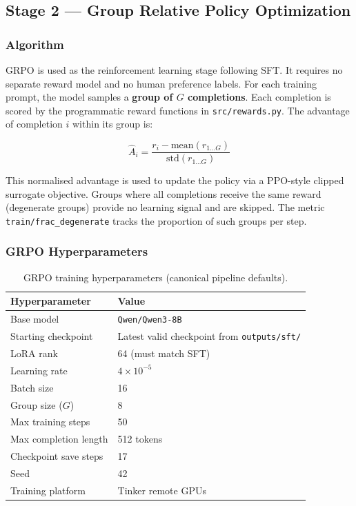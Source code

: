 \documentclass[12pt, a4paper]{article}
\newcommand{\thead}[1]{\textbf{#1}}
\begin{document}
\vspace{8pt}

\subsection{Stage 2 --- Group Relative Policy Optimization}

\subsubsection{Algorithm}

GRPO is used as the reinforcement learning stage following SFT. It requires no
separate reward model and no human preference labels. For each training prompt,
the model samples a \textbf{group of $G$ completions}. Each completion is scored
by the programmatic reward functions in \texttt{src/rewards.py}. The
advantage of completion $i$ within its group is:

\begin{equationbox}
\[
  \hat{A}_i = \frac{r_i - \mathrm{mean}(r_{1\ldots G})}{\mathrm{std}(r_{1\ldots G})}
\]
\end{equationbox}

This normalised advantage is used to update the policy via a PPO-style clipped
surrogate objective. Groups where all completions receive the same reward
(degenerate groups) provide no learning signal and are skipped. The metric
\texttt{train/frac\_degenerate} tracks the proportion of such groups per step.

\subsubsection{GRPO Hyperparameters}

\begin{table}[H]
\centering
\caption{GRPO training hyperparameters (canonical pipeline defaults).}
\begin{tabularx}{\linewidth}{L{5cm} C{9.2cm}}
\toprule
\thead{Hyperparameter} & \thead{Value} \\
\midrule
Base model & \texttt{Qwen/Qwen3-8B} \\
Starting checkpoint & Latest valid checkpoint from \texttt{outputs/sft/} \\
LoRA rank & 64 (must match SFT) \\
Learning rate & $4 \times 10^{-5}$ \\
Batch size & 16 \\
Group size ($G$) & 8 \\
Max training steps & 50 \\
Max completion length & 512 tokens \\
Checkpoint save steps & 17 \\
Seed & 42 \\
Training platform & Tinker remote GPUs \\
\bottomrule
\end{tabularx}
\end{table}
\end{document}
